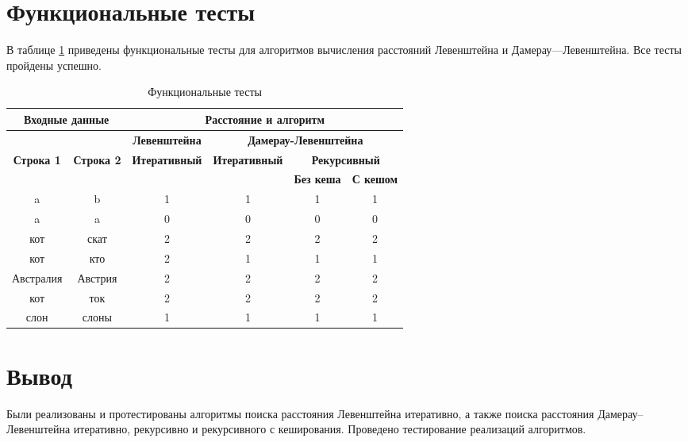 \clearpage

\section{Функциональные тесты}

В таблице \ref{tbl:func_tests} приведены функциональные тесты для алгоритмов вычисления расстояний Левенштейна и Дамерау—Левенштейна. Все тесты пройдены успешно.

\begin{table}[ht]
	\small
	\begin{center}
		\begin{threeparttable}
		\caption{Функциональные тесты}
		\label{tbl:func_tests}
		\begin{tabular}{|c|c|c|c|c|c|}
			\hline
			\multicolumn{2}{|c|}{\bfseries Входные данные}
			& \multicolumn{4}{c|}{\bfseries Расстояние и алгоритм} \\ 
			\hline 
			&
			& \multicolumn{1}{c|}{\bfseries Левенштейна} 
			& \multicolumn{3}{c|}{\bfseries Дамерау-Левенштейна} \\ \cline{3-6}
			
			\bfseries Строка 1 & \bfseries Строка 2 & \bfseries Итеративный & \bfseries Итеративный
			
			& \multicolumn{2}{c|}{\bfseries Рекурсивный} \\ \cline{5-6}
			& & & & \bfseries Без кеша & \bfseries С кешом \\
			\hline
			a & b & 1 & 1 & 1 & 1 \\
			\hline
			a & a & 0 & 0 & 0 & 0 \\
			\hline
			кот & скат & 2 & 2 & 2 & 2 \\
			\hline
			кот & кто & 2 & 1 & 1 & 1 \\
			\hline
			Австралия & Австрия & 2 & 2 & 2 & 2 \\
			\hline
			кот & ток & 2 & 2 & 2 & 2 \\
			\hline
			слон & слоны & 1 & 1 & 1 & 1 \\
			\hline
		\end{tabular}	
		\end{threeparttable}
	\end{center}
\end{table}

\section*{Вывод}
Были реализованы и протестированы алгоритмы поиска расстояния Левенштейна итеративно, а также поиска расстояния Дамерау–Левенштейна итеративно, рекурсивно и рекурсивного с кеширования. Проведено тестирование реализаций алгоритмов.
